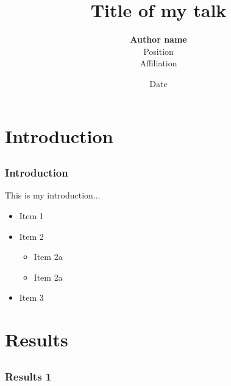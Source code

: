 \documentclass[pdf, usepdftitle=false]{beamer}
\title{Title of my talk}
\author{\textbf{Author name} \\ [\baselineskip]
    Position\\
    Affiliation
    }
\date{Date}
\begin{document}
\begin{frame}[plain]
\titlepage
\end{frame}  

\section{Introduction}
\subsection{}

\begin{frame}
\frametitle{Introduction}
This is my introduction...

\begin{itemize}
\item Item 1
\item Item 2

\begin{itemize}
\item Item 2a
\item Item 2a
\end{itemize}

\item Item 3 
\end{itemize}
\end{frame}

\section{Results}
\subsection{}  
\begin{frame}
\frametitle{Results 1} 
\end{frame}

\begin{frame}
\end{frame}
\end{document}
